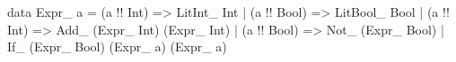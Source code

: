 \begin{code}
data Expr_ a
  = (a !\tyeq! Int)  => LitInt_  Int
  | (a !\tyeq! Bool) => LitBool_ Bool
  | (a !\tyeq! Int)  => Add_ (Expr_ Int) (Expr_ Int)
  | (a !\tyeq! Bool) => Not_ (Expr_ Bool)
  | If_ (Expr_ Bool) (Expr_ a) (Expr_ a)
\end{code}
